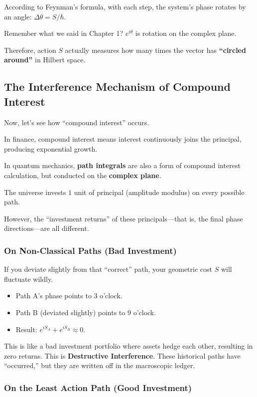 \documentclass[11pt,a4paper,twoside]{book}
\begin{document}
According to Feynman's formula, with each step, the system's phase rotates by an angle: $\Delta \theta = S / \hbar$.

Remember what we said in Chapter 1? $e^{i\theta}$ is rotation on the complex plane.

Therefore, action $S$ actually measures how many times the vector has \textbf{``circled around''} in Hilbert space.

\subsection{The Interference Mechanism of Compound Interest}

Now, let's see how ``compound interest'' occurs.

In finance, compound interest means interest continuously joins the principal, producing exponential growth.

In quantum mechanics, \textbf{path integrals} are also a form of compound interest calculation, but conducted on the \textbf{complex plane}.

The universe invests $1$ unit of principal (amplitude modulus) on every possible path.

However, the ``investment returns'' of these principals---that is, the final phase directions---are all different.

\subsubsection{On Non-Classical Paths (Bad Investment)}

If you deviate slightly from that ``correct'' path, your geometric cost $S$ will fluctuate wildly.

\begin{itemize}
\item Path A's phase points to 3 o'clock.

\item Path B (deviated slightly) points to 9 o'clock.

\item Result: \textbf{$e^{iS_A} + e^{iS_B} \approx 0$}.
\end{itemize}

This is like a bad investment portfolio where assets hedge each other, resulting in zero returns. This is \textbf{Destructive Interference}. These historical paths have ``occurred,'' but they are written off in the macroscopic ledger.

\subsubsection{On the Least Action Path (Good Investment)}
\end{document}
